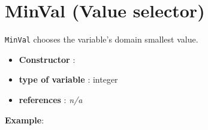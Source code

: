 \section{MinVal (Value selector)}\label{minval:minvalvalselector}\hypertarget{minval:minvalvalselector}{}
\begin{notedef}
  \texttt{MinVal} chooses the variable's domain smallest value.
\end{notedef}

\begin{itemize}
	\item \textbf{Constructor} : 
	\item \textbf{type of variable} : integer
	\item \textbf{references} : \emph{n/a}
\end{itemize}

\textbf{Example}:
%


